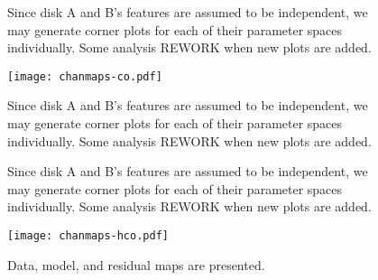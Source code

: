 



\begin{figure}[htp]
  \hspace*{\fill}%
  \hfill%
  \hspace*{\fill}%
  \caption{Since disk A and B's features are assumed to be independent, we may generate corner plots for each of their parameter spaces individually. Some analysis REWORK when new plots are added.}
  \label{fig:co_corner_plots}
\end{figure}


\begin{figure}[htp]
  \hspace*{\fill}%
  \texttt{[image: chanmaps-co.pdf]}\hfill%
  \hspace*{\fill}%
  \caption{Since disk A and B's features are assumed to be independent, we may generate corner plots for each of their parameter spaces individually. Some analysis REWORK when new plots are added.}
  \label{fig:co_chanmaps}
\end{figure}




\begin{figure}[htp]
  \hspace*{\fill}%
  \hfill%
  \hspace*{\fill}%
  \caption{Since disk A and B's features are assumed to be independent, we may generate corner plots for each of their parameter spaces individually. Some analysis REWORK when new plots are added.}
  \label{fig:co_corner_plots}
\end{figure}


\begin{figure}[htp]
  \hspace*{\fill}%
  \texttt{[image: chanmaps-hco.pdf]}\hfill%
  \hspace*{\fill}%
  \caption{Data, model, and residual maps are presented.}
  \label{fig:co_chanmaps}
\end{figure}


